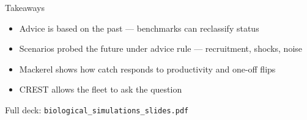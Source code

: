 \documentclass[12pt,aspectratio=169]{beamer}
\begin{document}
\begin{frame}{Takeaways}
  \begin{itemize}
    \item Advice is based on the past --- benchmarks can reclassify status
    \item Scenarios probed the future under advice rule --- recruitment, shocks, noise
    \item Mackerel shows how catch responds to productivity and one-off flips
    \item CREST allows the fleet to ask the question
  \end{itemize}
  \vspace{4mm}
  {\footnotesize\textcolor{bimsteel}{Full deck: \texttt{biological\_simulations\_slides.pdf}}}
\end{frame}
\end{document}
